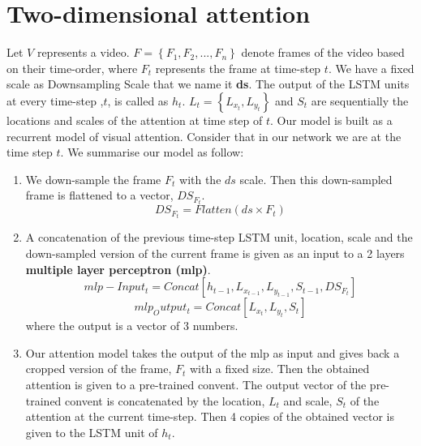 \documentclass{article} %
\begin{document}
\section{Two-dimensional attention}
Let $V$ represents a video. $F=\left \{ F_{1}, F_{2}, ..., F_{n} \right \}$ denote frames of the video based on their time-order, where $F_{t}$ represents the frame at time-step $t$. We have a fixed scale as Downsampling Scale that we name it \textbf{ds}. The output of the LSTM units at every time-step ,$t$, is called as $h_{t}$. $L_{t}=\left \{ L_{x_{t}},L_{y_{t}} \right \}$ and $S_{t}$ are sequentially the locations and scales of the attention at time step of $t$.
Our model is built as a recurrent model of visual attention. Consider that in our network we are at the time step $t$. We summarise our model as follow:
\begin{enumerate}
\item We down-sample the frame $F_{t}$ with the $ds$ scale. Then this down-sampled frame is flattened to a vector, $DS_{F_{t}}$.
\begin{equation}
DS_{F_{t}}=Flatten(ds\times F_{t})
\end{equation} 
\item A concatenation of the previous time-step LSTM unit, location, scale and the down-sampled version of the current frame is given as an input to a 2 layers \textbf{multiple layer perceptron (mlp)}.
\begin{equation}
mlp-Input_{t}=Concat\left [h_{t-1}, L_{x_{t-1}},L_{y_{t-1}}, S_{t-1}, DS_{F_{t}}\right]
\end{equation} 
\begin{equation}
mlp_Output_{t}=Concat\left [ L_{x_{t}}, L_{y_{t}}, S_{t}\right]
\end{equation}
where the output is a vector of 3 numbers.
\item Our attention model takes the output of the mlp as input and gives back a cropped version of the frame, $F_{t}$ with a fixed size. Then the obtained attention is given to a pre-trained convent. The output vector of the pre-trained convent is concatenated by the location, $L_{t}$ and scale, $S_{t}$ of the attention at the current time-step. Then 4 copies of the obtained vector is given to the LSTM unit of $h_{t}$.
\end{enumerate}
\end{document}
